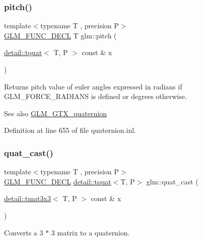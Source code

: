 \subsubsection{\texorpdfstring{pitch()}{pitch()}}
{\footnotesize\ttfamily template$<$typename T , precision P$>$ \\
\hyperlink{setup_8hpp_ab2d052de21a70539923e9bcbf6e83a51}{G\+L\+M\+\_\+\+F\+U\+N\+C\+\_\+\+D\+E\+CL} T glm\+::pitch (\begin{DoxyParamCaption}\item[{\hyperlink{structglm_1_1detail_1_1tquat}{detail\+::tquat}$<$ T, P $>$ const \&}]{x }\end{DoxyParamCaption})}

Returns pitch value of euler angles expressed in radians if G\+L\+M\+\_\+\+F\+O\+R\+C\+E\+\_\+\+R\+A\+D\+I\+A\+NS is defined or degrees otherwise.

\begin{DoxySeeAlso}{See also}
\hyperlink{group__gtx__quaternion}{G\+L\+M\+\_\+\+G\+T\+X\+\_\+quaternion} 
\end{DoxySeeAlso}


Definition at line 655 of file quaternion.\+inl.

\mbox{\label{group__gtc__quaternion_gafb826745dedb1760100bbd25d0f63fde}} 
\subsubsection{\texorpdfstring{quat\+\_\+cast()}{quat\_cast()}\hspace{0.1cm}{\footnotesize\ttfamily [1/2]}}
{\footnotesize\ttfamily template$<$typename T , precision P$>$ \\
\hyperlink{setup_8hpp_ab2d052de21a70539923e9bcbf6e83a51}{G\+L\+M\+\_\+\+F\+U\+N\+C\+\_\+\+D\+E\+CL} \hyperlink{structglm_1_1detail_1_1tquat}{detail\+::tquat}$<$T, P$>$ glm\+::quat\+\_\+cast (\begin{DoxyParamCaption}\item[{\hyperlink{structglm_1_1detail_1_1tmat3x3}{detail\+::tmat3x3}$<$ T, P $>$ const \&}]{x }\end{DoxyParamCaption})}

Converts a 3 $\ast$ 3 matrix to a quaternion.

